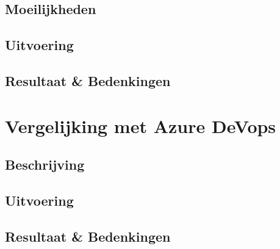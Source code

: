 \subsection{Moeilijkheden}
\subsection{Uitvoering}
\subsection{Resultaat \& Bedenkingen}
\section{Vergelijking met Azure DeVops}
\subsection{Beschrijving}
\subsection{Uitvoering}
\subsection{Resultaat \& Bedenkingen}

